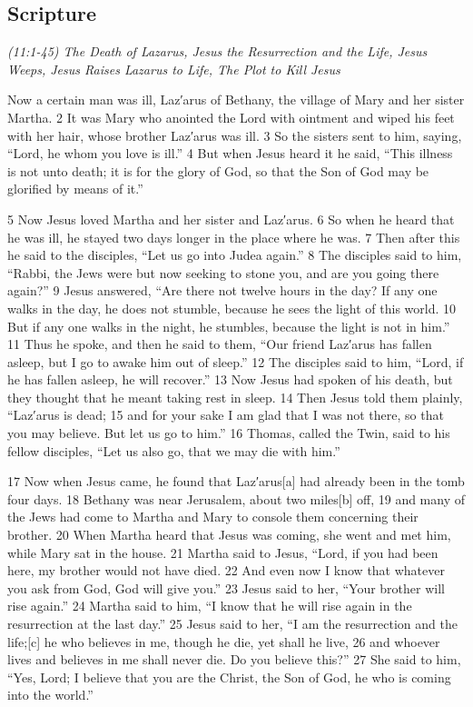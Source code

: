 \documentclass[letterpaper]{report}
\begin{document}
\subsection{Scripture}

{\centering
	\emph{(11:1-45) The Death of Lazarus,
		Jesus the Resurrection and the Life,
		Jesus Weeps,
		Jesus Raises Lazarus to Life,
		The Plot to Kill Jesus}\\
}
\begin{multicols}{2}
Now a certain man was ill, Laz′arus of Bethany, the village of Mary and her sister Martha. 2 It was Mary who anointed the Lord with ointment and wiped his feet with her hair, whose brother Laz′arus was ill. 3 So the sisters sent to him, saying, “Lord, he whom you love is ill.” 4 But when Jesus heard it he said, “This illness is not unto death; it is for the glory of God, so that the Son of God may be glorified by means of it.”

5 Now Jesus loved Martha and her sister and Laz′arus. 6 So when he heard that he was ill, he stayed two days longer in the place where he was. 7 Then after this he said to the disciples, “Let us go into Judea again.” 8 The disciples said to him, “Rabbi, the Jews were but now seeking to stone you, and are you going there again?” 9 Jesus answered, “Are there not twelve hours in the day? If any one walks in the day, he does not stumble, because he sees the light of this world. 10 But if any one walks in the night, he stumbles, because the light is not in him.” 11 Thus he spoke, and then he said to them, “Our friend Laz′arus has fallen asleep, but I go to awake him out of sleep.” 12 The disciples said to him, “Lord, if he has fallen asleep, he will recover.” 13 Now Jesus had spoken of his death, but they thought that he meant taking rest in sleep. 14 Then Jesus told them plainly, “Laz′arus is dead; 15 and for your sake I am glad that I was not there, so that you may believe. But let us go to him.” 16 Thomas, called the Twin, said to his fellow disciples, “Let us also go, that we may die with him.”

17 Now when Jesus came, he found that Laz′arus[a] had already been in the tomb four days. 18 Bethany was near Jerusalem, about two miles[b] off, 19 and many of the Jews had come to Martha and Mary to console them concerning their brother. 20 When Martha heard that Jesus was coming, she went and met him, while Mary sat in the house. 21 Martha said to Jesus, “Lord, if you had been here, my brother would not have died. 22 And even now I know that whatever you ask from God, God will give you.” 23 Jesus said to her, “Your brother will rise again.” 24 Martha said to him, “I know that he will rise again in the resurrection at the last day.” 25 Jesus said to her, “I am the resurrection and the life;[c] he who believes in me, though he die, yet shall he live, 26 and whoever lives and believes in me shall never die. Do you believe this?” 27 She said to him, “Yes, Lord; I believe that you are the Christ, the Son of God, he who is coming into the world.”


\end{multicols}
\end{document}
